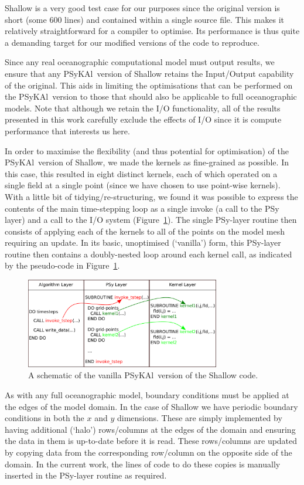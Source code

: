 \documentclass[journal]{IEEEtran}
\newcommand{\psykal}{{PS}y{KA}l\ }
\begin{document}
Shallow is a very good test case for our purposes since the original
version is short (some 600 lines) and contained within a single source
file. This makes it relatively straightforward for a compiler to
optimise. Its performance is thus quite a demanding target for our
modified versions of the code to reproduce.

Since any real oceanographic computational model must output results,
we ensure that any \psykal version of Shallow retains the Input/Output
capability of the original. This aids in limiting the optimisations
that can be performed on the \psykal version to those that should also
be applicable to full oceanographic models. Note that although we
retain the I/O functionality, all of the results presented in this work
carefully exclude the effects of I/O since it is compute performance
that interests us here.

In order to maximise the flexibility (and thus potential for
optimisation) of the \psykal version of Shallow, we made the kernels
as fine-grained as possible. In this case, this resulted in eight
distinct kernels, each of which operated on a single field at a single
point (since we have chosen to use point-wise kernels). With a little
bit of tidying/re-structuring, we found it was possible to express the
contents of the main time-stepping loop as a single invoke (a call to
the PSy layer) and a call to the I/O system
(Figure~\ref{FIG_psykal_shallow_structure}). The single PSy-layer
routine then consists of applying each of the kernels to all of the
points on the model mesh requiring an update. In its basic,
unoptimised (`vanilla') form, this PSy-layer routine then contains a
doubly-nested loop around each kernel call, as indicated by the
pseudo-code in Figure~\ref{FIG_psykal_shallow_structure}.

\begin{figure}
\centering
\includegraphics[width=85mm]{psykal_shallow}
\caption{A schematic of the vanilla \psykal version of the Shallow code.}
\label{FIG_psykal_shallow_structure}
\end{figure}

As with any full oceanographic model, boundary conditions must be
applied at the edges of the model domain. In the case of Shallow we
have periodic boundary conditions in both the $x$ and $y$ dimensions.
These are simply implemented by having additional (`halo')
rows/columns at the edges of the domain and ensuring the data in them
is up-to-date before it is read. These rows/columns are updated by
copying data from the corresponding row/column on the opposite side of
the domain. In the current work, the lines of code to do these copies
is manually inserted in the PSy-layer routine as required.
\end{document}
